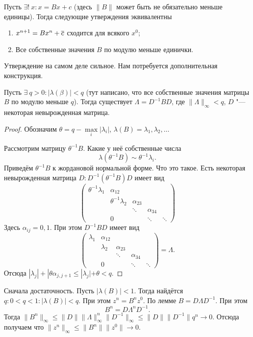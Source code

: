 \begin{The}
 Пусть $\exists!\ x\colon x = Bx + c$ (здесь $\|B\|$ может быть не обязательно меньше единицы). Тогда следующие утверждения эквивалентны
\begin{enumerate}
 \item $x^{n+1} = Bx^n + \overline{c}$ сходится для всякого $x^0$;
\item Все собственные значения $B$ по модулю меньше единички.
\end{enumerate}
\end{The}
\begin{Proof}
 Утверждение на самом деле сильное. Нам потребуется дополнительная конструкция.
\begin{Lem}
 Пусть $\exists\ q>0\colon \big|\lambda(\beta)\big|<q$ (тут написано, что все собственные значения матрицы $B$ по модулю меньше $q$). Тогда существует $\Lambda = D^{-1}BD$, где $\|\Lambda\|_\infty<q$, $D$ "--- некоторая невырожденная матрица.
\end{Lem}
\begin{proof}
  Обозначим $\theta = q - \max\limits_i|\lambda_i|$, $\lambda(B) = \lambda_1,\lambda_2,\dots$

Рассмотрим матрицу $\theta^{-1}B$. Какие у неё собственные числа
\[
  \lambda(\theta^{-1}B)\sim \theta^{-1}\lambda_i.
\]
Приведём $\theta^{-1}B$ к жордановой нормальной форме. Что это такое. Есть некоторая невырожденная матрица $D\colon D^{-1}(\theta^{-1}B)D$ имеет вид
\[
\begin{pmatrix}
 \theta^{-1} \lambda_1 & \alpha_{12} &  & & \\
  & \theta^{-1} \lambda_2 & \alpha_{23} & & \\
  & & \ddots & \alpha_{34} & \\
 & 0 & & \ddots & \ddots
\end{pmatrix}
\]
Здесь $\alpha_{ij} = 0,1$. При этом $D^{-1}BD$ имеет вид
\[
\begin{pmatrix}
 \lambda_1 & \alpha_{12} &  & & \\
  & \lambda_2 & \alpha_{23} & & \\
  & & \ddots & \alpha_{34} & \\
 & 0 & & \ddots & \ddots
\end{pmatrix} = \Lambda.
\]
Отсюда $|\lambda_j| + |\theta \alpha_{j,j+1}\le |\lambda_j| + \theta < q$.
\end{proof}

Сначала достаточность. Пусть $\big|\lambda(B)\big| <1$. Тогда найдётся $q\colon 0<q<1\colon \big|\lambda(B)\big|<q$. При этом $z^n = B^nz^0$. По лемме $B = D\Lambda D^{-1}$. При этом
\[
  B^n = D \Lambda^n D^{-1}.
\]
Тогда $\|B^n\|_\infty \le \|D\| \|\Lambda\|^n_\infty \|D^{-1}\|_\infty \le \|D\| \|D^{-1}\| q^n\to 0$.
Отсюда получаем что $\|z^n\|_\infty\le \|B^n\|\|z^0\|\to 0$.


\end{Proof}
